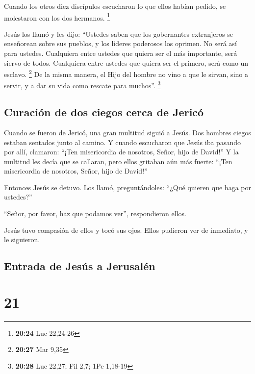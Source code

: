  Cuando los otros diez discípulos escucharon lo que ellos
habían pedido, se molestaron con los dos hermanos. \footnote{\textbf{20:24}
  Luc 22,24-26}

 Jesús los llamó y les dijo: ``Ustedes saben que los
gobernantes extranjeros se enseñorean sobre sus pueblos, y los líderes
poderosos los oprimen.  No será así para ustedes.
Cualquiera entre ustedes que quiera ser el más importante, será siervo
de todos.  Cualquiera entre ustedes que quiera ser el
primero, será como un esclavo. \footnote{\textbf{20:27} Mar 9,35}
 De la misma manera, el Hijo del hombre no vino a que le
sirvan, sino a servir, y a dar su vida como rescate para muchos''.
\footnote{\textbf{20:28} Luc 22,27; Fil 2,7; 1Pe 1,18-19}

\hypertarget{curaciuxf3n-de-dos-ciegos-cerca-de-jericuxf3}{%
\subsection{Curación de dos ciegos cerca de
Jericó}\label{curaciuxf3n-de-dos-ciegos-cerca-de-jericuxf3}}

 Cuando se fueron de Jericó, una gran multitud siguió a
Jesús.  Dos hombres ciegos estaban sentados junto al
camino. Y cuando escucharon que Jesús iba pasando por allí, clamaron:
``¡Ten misericordia de nosotros, Señor, hijo de David!'' 
Y la multitud les decía que se callaran, pero ellos gritaban aún más
fuerte: ``¡Ten misericordia de nosotros, Señor, hijo de David!''

 Entonces Jesús se detuvo. Los llamó, preguntándoles:
``¿Qué quieren que haga por ustedes?''

 ``Señor, por favor, haz que podamos ver'', respondieron
ellos.

 Jesús tuvo compasión de ellos y tocó sus ojos. Ellos
pudieron ver de inmediato, y le siguieron.

\hypertarget{entrada-de-jesuxfas-a-jerusaluxe9n}{%
\subsection{Entrada de Jesús a
Jerusalén}\label{entrada-de-jesuxfas-a-jerusaluxe9n}}

\hypertarget{section-20}{%
\section{21}\label{section-20}}

